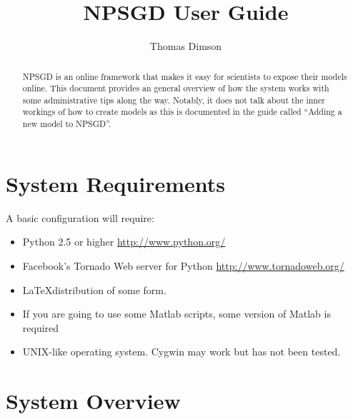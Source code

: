 \documentclass{article}
\title{NPSGD User Guide}
\author{Thomas Dimson}
\begin{document}
\maketitle
\begin{abstract}
    NPSGD is an online framework that makes it easy for scientists to expose
    their models online. This document provides an general overview of how the
    system works with some administrative tips along the way. Notably, it does
    not talk about the inner workings of how to create models as this is
    documented in the guide called ``Adding a new model to NPSGD''.
\end{abstract}
\tableofcontents

\section{System Requirements}
A basic configuration will require:
\begin{itemize}
    \item Python 2.5 or higher \url{http://www.python.org/}
    \item Facebook's Tornado Web server for Python
    \url{http://www.tornadoweb.org/}
    \item \LaTeX distribution of some form.
    \item If you are going to use some Matlab scripts, some version of Matlab is
    required
    \item UNIX-like operating system. Cygwin may work but has not been tested.
\end{itemize}


\section{System Overview}
\end{document}
